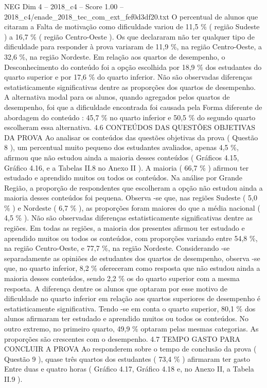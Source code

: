 \begin{textsample}{NEG Dim 4 – 2018\_c4 – Score 1.00 – 2018\_c4/enade\_2018\_tec\_com\_ext\_fef0d3df20.txt}
O percentual de alunos que citaram a Falta de motivação como dificuldade variou de 11,5 \% ( região Sudeste ) a 16,7 \% ( região Centro-Oeste ).
Os que declararam não ter qualquer tipo de dificuldade para responder à prova variaram de 11,9 \%, na região Centro-Oeste, a 32,6 \%, na região Nordeste.
Em relação aos quartos de desempenho, o Desconhecimento do conteúdo foi a opção escolhida por 18,9 \% dos estudantes do quarto superior e por 17,6 \% do quarto inferior.
Não são observadas diferenças estatisticamente significativas dentre as proporções dos quartos de desempenho.
A alternativa modal para os alunos, quando agregados pelos quartos de desempenho, foi que a dificuldade encontrada foi causada pela Forma diferente de abordagem do conteúdo : 45,7 \% no quarto inferior e 50,5 \% do segundo quarto escolheram essa alternativa. 4.6 CONTEÚDOS DAS QUESTÕES OBJETIVAS DA PROVA Ao analisar os conteúdos das questões objetivas da prova ( Questão 8 ), um percentual muito pequeno dos estudantes avaliados, apenas 4,5 \%, afirmou que não estudou ainda a maioria desses conteúdos ( Gráficos 4.15, Gráfico 4.16, e a Tabelas II.8 no Anexo II ).
A maioria ( 66,7 \% ) afirmou ter estudado e aprendido muitos ou todos os conteúdos.
Na análise por Grande Região, a proporção de respondentes que escolheram a opção não estudou ainda a maioria desses conteúdos foi pequena.
Observa -se que, nas regiões Sudeste ( 5,0 \% ) e Nordeste ( 6,7 \% ), as proporções foram maiores do que a média nacional ( 4,5 \% ).
Não são observadas diferenças estatisticamente significativas dentre as regiões.
Em todas as regiões, a maioria dos presentes afirmou ter estudado e aprendido muitos ou todos os conteúdos, com proporções variando entre 54,8 \%, na região Centro-Oeste, e 77,7 \%, na região Nordeste.
Considerando -se separadamente as opiniões de estudantes dos quartos de desempenho, observa -se que, no quarto inferior, 8,2 \% ofereceram como resposta que não estudou ainda a maioria desses conteúdos, sendo 2,2 \% os do quarto superior com a mesma resposta.
A diferença dentre os alunos que optaram por esse motivo de dificuldade no quarto inferior em relação aos quartos superiores de desempenho é estatisticamente significativa.
Tendo -se em conta o quarto superior, 80,1 \% dos alunos afirmaram ter estudado e aprendido muitos ou todos os conteúdos.
No outro extremo, no primeiro quarto, 49,9 \% optaram pelas mesmas categorias.
As proporções são crescentes com o desempenho. 4.7 TEMPO GASTO PARA CONCLUIR A PROVA Ao responderem sobre o tempo de conclusão da prova ( Questão 9 ), quase três quartos dos estudantes ( 73,4 \% ) afirmaram ter gasto Entre duas e quatro horas ( Gráfico 4.17, Gráfico 4.18 e, no Anexo II, a Tabela II.9 ).

\end{textsample}

